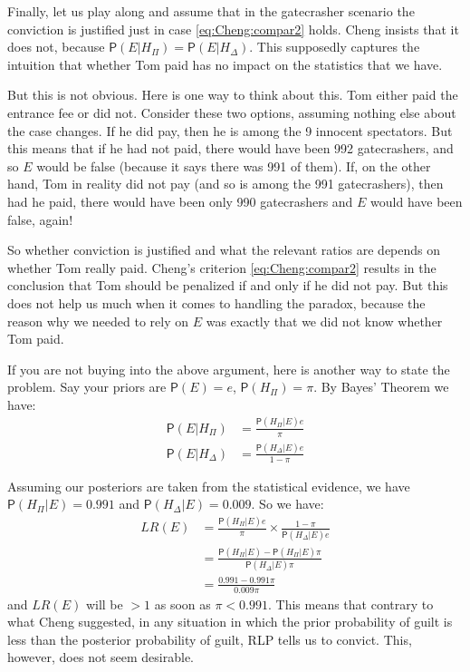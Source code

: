 \documentclass[10pt,dvipsnames,enabledeprecatedfontcommands]{scrartcl}
\newcommand{\pr}[1]{\mathsf{P}(#1)}
\begin{document}
Finally, let us play along and assume that in the gatecrasher scenario
the conviction is justified just in case \eqref{eq:Cheng:compar2} holds.
Cheng insists that it does not, because
\(\pr{E\vert H_\Pi}=\pr{E\vert H_\Delta}\). This supposedly captures the
intuition that whether Tom paid has no impact on the statistics that we
have.

But this is not obvious. Here is one way to think about this. Tom either
paid the entrance fee or did not. Consider these two options, assuming
nothing else about the case changes. If he did pay, then he is among the
9 innocent spectators. But this means that if he had not paid, there
would have been 992 gatecrashers, and so \(E\) would be false (because
it says there was 991 of them). If, on the other hand, Tom in reality
did not pay (and so is among the 991 gatecrashers), then had he paid,
there would have been only 990 gatecrashers and \(E\) would have been
false, again!

So whether conviction is justified and what the relevant ratios are
depends on whether Tom really paid. Cheng's criterion
\eqref{eq:Cheng:compar2} results in the conclusion that Tom should be
penalized if and only if he did not pay. But this does not help us much
when it comes to handling the paradox, because the reason why we needed
to rely on \(E\) was exactly that we did not know whether Tom paid.

If you are not buying into the above argument, here is another way to
state the problem. Say your priors are \(\pr{E}=e\), \(\pr{H_\Pi}=\pi\).
By Bayes' Theorem we have: \begin{align*}
 \pr{E\vert H_\Pi} & = \frac{\pr{H_\Pi\vert E}e}{\pi}\\
 \pr{E\vert H_\Delta} & = \frac{\pr{H_\Delta\vert E}e}{1-\pi}
 \end{align*}

\noindent Assuming our posteriors are taken from the statistical
evidence, we have \(\pr{H_\Pi\vert E}=0.991\) and
\(\pr{H_\Delta\vert E }=0.009\). So we have: \begin{align}
 \label{eq:Cheng_lre} LR(E) & = \frac{\pr{H_\Pi\vert E}e}{\pi}\times \frac{1-\pi}{\pr{H_\Delta\vert E}e}\\ \nonumber
 & = \frac{\pr{H_\Pi \vert E} - \pr{H_\Pi\vert E}\pi}{\pr{H_\Delta\vert E}\pi}\\ \nonumber
 & = \frac{0.991-0.991\pi}{0.009\pi}
 \end{align} \noindent and \(LR(E)\) will be \(>1\) as soon as
\(\pi<0.991\). This means that contrary to what Cheng suggested, in any
situation in which the prior probability of guilt is less than the
posterior probability of guilt, RLP tells us to convict. This, however,
does not seem desirable.
\end{document}
